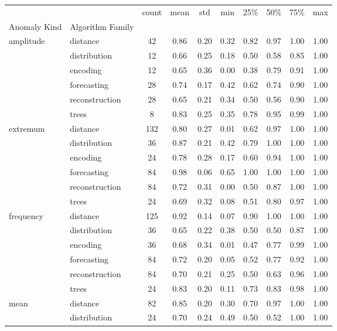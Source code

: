 \begin{tabular}{|l|l|c|c|c|c|c|c|c|c|}
\toprule
 &  & count & mean & std & min & 25\% & 50\% & 75\% & max \\
Anomaly Kind & Algorithm Family &  &  &  &  &  &  &  &  \\
\midrule
\multirow[t]{6}{*}{amplitude} & distance & 42 & 0.86 & 0.20 & 0.32 & 0.82 & 0.97 & 1.00 & 1.00 \\
 & distribution & 12 & 0.66 & 0.25 & 0.18 & 0.50 & 0.58 & 0.85 & 1.00 \\
 & encoding & 12 & 0.65 & 0.36 & 0.00 & 0.38 & 0.79 & 0.91 & 1.00 \\
 & forecasting & 28 & 0.74 & 0.17 & 0.42 & 0.62 & 0.74 & 0.90 & 1.00 \\
 & reconstruction & 28 & 0.65 & 0.21 & 0.34 & 0.50 & 0.56 & 0.90 & 1.00 \\
 & trees & 8 & 0.83 & 0.25 & 0.35 & 0.78 & 0.95 & 0.99 & 1.00 \\
\cline{1-10}
\multirow[t]{6}{*}{extremum} & distance & 132 & 0.80 & 0.27 & 0.01 & 0.62 & 0.97 & 1.00 & 1.00 \\
 & distribution & 36 & 0.87 & 0.21 & 0.42 & 0.79 & 1.00 & 1.00 & 1.00 \\
 & encoding & 24 & 0.78 & 0.28 & 0.17 & 0.60 & 0.94 & 1.00 & 1.00 \\
 & forecasting & 84 & 0.98 & 0.06 & 0.65 & 1.00 & 1.00 & 1.00 & 1.00 \\
 & reconstruction & 84 & 0.72 & 0.31 & 0.00 & 0.50 & 0.87 & 1.00 & 1.00 \\
 & trees & 24 & 0.69 & 0.32 & 0.08 & 0.51 & 0.80 & 0.97 & 1.00 \\
\cline{1-10}
\multirow[t]{6}{*}{frequency} & distance & 125 & 0.92 & 0.14 & 0.07 & 0.90 & 1.00 & 1.00 & 1.00 \\
 & distribution & 36 & 0.65 & 0.22 & 0.38 & 0.50 & 0.50 & 0.87 & 1.00 \\
 & encoding & 36 & 0.68 & 0.34 & 0.01 & 0.47 & 0.77 & 0.99 & 1.00 \\
 & forecasting & 84 & 0.72 & 0.20 & 0.05 & 0.52 & 0.77 & 0.92 & 1.00 \\
 & reconstruction & 84 & 0.70 & 0.21 & 0.25 & 0.50 & 0.63 & 0.96 & 1.00 \\
 & trees & 24 & 0.83 & 0.20 & 0.11 & 0.73 & 0.83 & 0.98 & 1.00 \\
\cline{1-10}
\multirow[t]{6}{*}{mean} & distance & 82 & 0.85 & 0.20 & 0.30 & 0.70 & 0.97 & 1.00 & 1.00 \\
 & distribution & 24 & 0.70 & 0.24 & 0.49 & 0.50 & 0.52 & 1.00 & 1.00 \\

\end{tabular}

